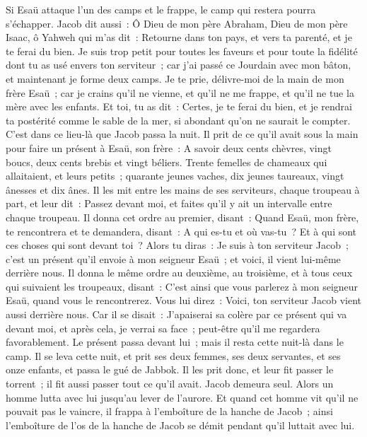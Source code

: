 \begin{multicols}{2}
Si Esaü attaque l'un des camps et le frappe, le camp qui restera pourra s'échapper.
Jacob dit aussi~: Ô Dieu de mon père Abraham, Dieu de mon père Isaac, ô Yahweh qui m'as dit~: Retourne dans ton pays, et vers ta parenté, et je te ferai du bien.
Je suis trop petit pour toutes les faveurs et pour toute la fidélité dont tu as usé envers ton serviteur~; car j'ai passé ce Jourdain avec mon bâton, et maintenant je forme deux camps.
Je te prie, délivre-moi de la main de mon frère Esaü~; car je crains qu'il ne vienne, et qu'il ne me frappe, et qu'il ne tue la mère avec les enfants.
Et toi, tu as dit~: Certes, je te ferai du bien, et je rendrai ta postérité comme le sable de la mer, si abondant qu'on ne saurait le compter.
C'est dans ce lieu-là que Jacob passa la nuit. Il prit de ce qu'il avait sous la main pour faire un présent à Esaü, son frère~:
A savoir deux cents chèvres, vingt boucs, deux cents brebis et vingt béliers.
Trente femelles de chameaux qui allaitaient, et leurs petits~; quarante jeunes vaches, dix jeunes taureaux, vingt ânesses et dix ânes.
Il les mit entre les mains de ses serviteurs, chaque troupeau à part, et leur dit~: Passez devant moi, et faites qu'il y ait un intervalle entre chaque troupeau.
Il donna cet ordre au premier, disant~: Quand Esaü, mon frère, te rencontrera et te demandera, disant~: A qui es-tu et où vas-tu~? Et à qui sont ces choses qui sont devant toi~?
Alors tu diras~: Je suis à ton serviteur Jacob~; c'est un présent qu'il envoie à mon seigneur Esaü~; et voici, il vient lui-même derrière nous.
Il donna le même ordre au deuxième, au troisième, et à tous ceux qui suivaient les troupeaux, disant~: C'est ainsi que vous parlerez à mon seigneur Esaü, quand vous le rencontrerez.
Vous lui direz~: Voici, ton serviteur Jacob vient aussi derrière nous. Car il se disait~: J'apaiserai sa colère par ce présent qui va devant moi, et après cela, je verrai sa face~; peut-être qu'il me regardera favorablement.
Le présent passa devant lui~; mais il resta cette nuit-là dans le camp.
Il se leva cette nuit, et prit ses deux femmes, ses deux servantes, et ses onze enfants, et passa le gué de Jabbok.
Il les prit donc, et leur fit passer le torrent~; il fit aussi passer tout ce qu'il avait.
Jacob demeura seul. Alors un homme lutta avec lui jusqu'au lever de l'aurore.
Et quand cet homme vit qu'il ne pouvait pas le vaincre, il frappa à l'emboîture de la hanche de Jacob~; ainsi l'emboîture de l'os de la hanche de Jacob se démit pendant qu'il luttait avec lui.

\end{multicols}
